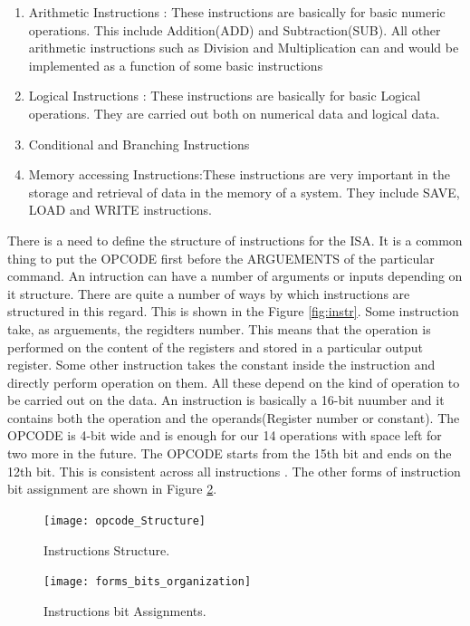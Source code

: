 \begin{enumerate}
\item Arithmetic Instructions : These instructions are basically for basic numeric operations. This include Addition(ADD) and Subtraction(SUB). All other arithmetic instructions such as Division and Multiplication can and would be implemented as a function of some basic instructions
\item Logical Instructions : These instructions are basically for basic Logical operations. They are carried out both on numerical data and logical data. 
\item Conditional and Branching Instructions
\item Memory accessing Instructions:These instructions are very important in the storage and retrieval of data in the memory of a system. They include SAVE, LOAD and WRITE instructions.
\end{enumerate}

There is a need to define the structure of instructions for the ISA. It is a common thing to put the OPCODE first before the ARGUEMENTS of the particular command. An intruction can have a number of arguments or inputs depending on it structure. There are quite a number of ways by which instructions are structured in this regard. This is shown in the Figure \ref{fig:instr}. Some instruction take, as arguements, the regidters number. This means that the operation is performed on the content of the registers and stored in a particular output register. Some other instruction takes the constant inside the instruction and directly perform operation on them. All these depend on the kind of operation to be carried out on the data. 
An instruction is basically a 16-bit nuumber and it contains both the operation and the operands(Register number or constant). The OPCODE is 4-bit wide and is enough for our 14 operations with space left for two more in the future. The OPCODE starts from the 15th bit and ends on the 12th bit. This is consistent across all instructions . The other forms of instruction bit assignment are shown in Figure \ref{fig:inst_bit_srt}. 

\begin{figure}[p]

\texttt{[image: opcode\_Structure]}
\centering
\caption{Instructions Structure.}
\centering
\label{fig:inst_str}
\end{figure}


\begin{figure}[p]

\texttt{[image: forms\_bits\_organization]}
\centering
\caption{Instructions bit Assignments.}
\centering
\label{fig:inst_bit_srt}
\end{figure}


